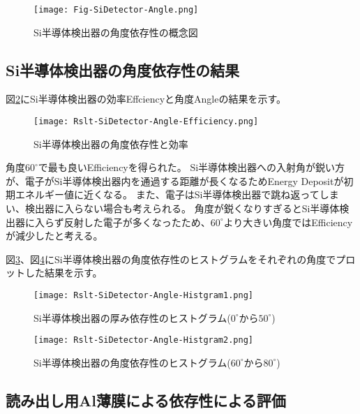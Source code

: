 \documentclass[a4paper,10pt]{jreport}
\begin{document}
\begin{figure}[H]
	\center
	\texttt{[image: Fig-SiDetector-Angle.png]}
	\caption{Si半導体検出器の角度依存性の概念図} \label{Fig-SiDetector-Angle}
\end{figure}



\subsection{Si半導体検出器の角度依存性の結果}

図\ref{Rslt-SiDetector-Angle-Efficiency}にSi半導体検出器の効率Effciencyと角度Angleの結果を示す。
	
\begin{figure}[H]
	\center
	\texttt{[image: Rslt-SiDetector-Angle-Efficiency.png]}
	\caption{Si半導体検出器の角度依存性と効率} \label{Rslt-SiDetector-Angle-Efficiency}
\end{figure}

角度$60^{\circ}$で最も良いEfficiencyを得られた。
Si半導体検出器への入射角が鋭い方が、電子がSi半導体検出器内を通過する距離が長くなるためEnergy Depositが初期エネルギー値に近くなる。
また、電子はSi半導体検出器で跳ね返ってしまい、検出器に入らない場合も考えられる。
角度が鋭くなりすぎるとSi半導体検出器に入らず反射した電子が多くなったため、$60^{\circ}$より大きい角度ではEfficiencyが減少したと考える。

図\ref{Rslt-SiDetector-Angle-Histgram1}、図\ref{Rslt-SiDetector-Angle-Histgram2}にSi半導体検出器の角度依存性のヒストグラムをそれぞれの角度でプロットした結果を示す。

\begin{figure}[H]
	\center
	\texttt{[image: Rslt-SiDetector-Angle-Histgram1.png]}
	\caption{Si半導体検出器の厚み依存性のヒストグラム($0^{\circ}$から$50^{\circ}$)} \label{Rslt-SiDetector-Angle-Histgram1}
\end{figure}

\begin{figure}[H]
	\center
	\texttt{[image: Rslt-SiDetector-Angle-Histgram2.png]}
	\caption{Si半導体検出器の角度依存性のヒストグラム($60^{\circ}$から$80^{\circ}$)} \label{Rslt-SiDetector-Angle-Histgram2}
\end{figure}



	
\subsection{読み出し用Al薄膜による依存性による評価}
\end{document}
